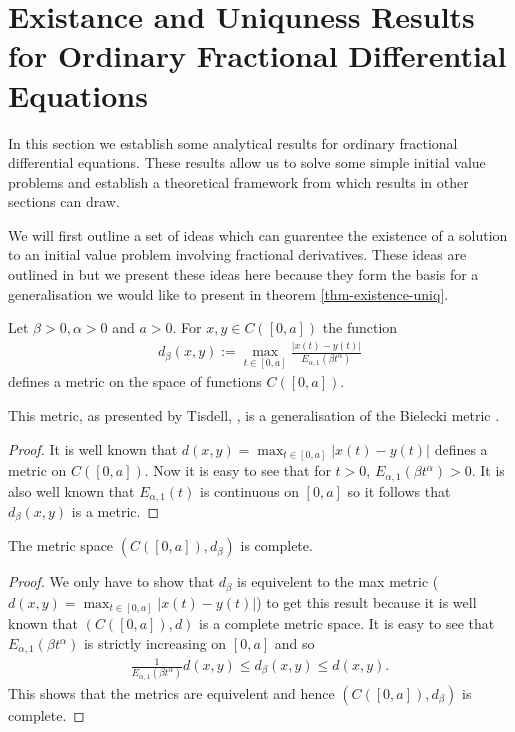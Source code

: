 \section{Existance and Uniquness Results for Ordinary Fractional Differential Equations}
In this section we establish some analytical results for ordinary fractional differential equations. These results allow us to solve some simple initial value problems and establish a theoretical framework from which results in other sections can draw.

We will first outline a set of ideas which can guarentee the existence of a solution to an initial value problem involving fractional derivatives. These ideas are outlined in \cite{Tisdell2012} but we present these ideas here because they form the basis for a generalisation we would like to present in theorem \ref{thm-existence-uniq}.

\begin{mdframed}[innertopmargin=10pt]
\begin{propdef}
    Let $ \beta > 0, \alpha > 0 $ and $ a > 0 $. For $ x,y \in C([0,a]) $ the function
    \begin{align}
        d_{\beta}(x,y) := \max_{t \in [0,a]} \frac{|x(t) - y(t)|}{E_{\alpha,1}(\beta t^\alpha)}
    \end{align}
    defines a metric on the space of functions $ C([0,a]) $. 
\end{propdef}
\end{mdframed}

This metric, as presented by Tisdell, \cite{Tisdell2012}, is a generalisation of the Bielecki metric \cite{Tisdell2012, Bielecki1956}. 

\begin{proof}
    It is well known that $ d(x,y) = \max_{t \in [0,a]}|x(t) - y(t)| $ defines a metric on $C([0,a]) $. Now it is easy to see that for $ t > 0 $, $ E_{\alpha,1}(\beta t^\alpha) >0 $. It is also well known that $ E_{\alpha,1}(t) $ is continuous on $ [0, a] $ so it follows that $ d_{\beta}(x,y) $ is a metric.
\end{proof}

\begin{mdframed}[innertopmargin=10pt]
\begin{lemma}
    The metric space $ (C([0,a]), d_\beta) $ is complete.
\end{lemma}
\end{mdframed}
\begin{proof}
    We only have to show that $ d_\beta $ is equivelent to the max metric ($ d(x,y) = \max_{t \in [0,a]}|x(t) - y(t)| $) to get this result because it is well known that $ (C([0,a]), d) $ is a complete metric space.
    It is easy to see that $ E_{\alpha, 1}(\beta t^\alpha) $ is strictly increasing on $ [0, a] $ and so 
    \begin{align}
        \frac{1}{E_{\alpha, 1}(\beta t^\alpha)} d(x,y) \leq d_\beta(x,y) \leq d(x,y).
    \end{align}
    This shows that the metrics are equivelent and hence $ (C([0,a]), d_\beta) $ is complete.
\end{proof}

